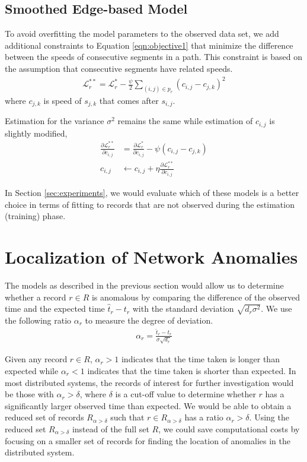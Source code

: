 \documentclass[conference]{IEEEtran.1.8}
\begin{document}
\subsection{Smoothed Edge-based Model}

To avoid overfitting the model parameters to the observed data set, we add additional constraints to Equation \ref{eqn:objective1} that minimize the difference between the speeds of consecutive segments in a path. This constraint is based on the assumption that consecutive segments have related speeds.
\begin{align*}
	\mathcal{L}^{**}_r = \mathcal{L}^*_r - \frac{\psi}{2} \sum_{(i,j) \in p_r} \left( c_{i,j} - c_{j,k} \right)^2
\end{align*}
where $c_{j,k}$ is speed of $s_{j,k}$ that comes after $s_{i,j}$.

Estimation for the variance $\sigma^2$ remains the same while estimation of $c_{i,j}$ is slightly modified,
\begin{align*}
	\frac{\partial \mathcal{L}^{**}_r}{\partial c_{i,j}} &= \frac{\partial \mathcal{L}^*_r}{\partial c_{i,j}} - \psi (c_{i,j} - c_{j,k}) \\
	c_{i,j} &\leftarrow c_{i,j} + \eta \frac{\partial \mathcal{L}^{**}_r}{\partial c_{i,j}}
\end{align*}

In Section \ref{sec:experiments}, we would evaluate which of these models is a better choice in terms of fitting to records that are not observed during the estimation (training) phase.

\section{Localization of Network Anomalies}
\label{sec:localization}

The models as described in the previous section would allow us to determine whether a record $r \in R$ is anomalous by comparing the difference of the observed time and the expected time $\hat{t}_r - t_r$ with the standard deviation $\sqrt{d_r \sigma^2}$. We use the following ratio $\alpha_r$ to measure the degree of deviation.
\begin{align}
	\label{eqn:alpha_ratio}
	\alpha_r = \frac{\hat{t}_r - t_r}{\sigma \sqrt{d_r}}
\end{align}

Given any record $r \in R$, $\alpha_r > 1$ indicates that the time taken is longer than expected while $\alpha_r < 1$ indicates that the time taken is shorter than expected. In most distributed systems, the records of interest for further investigation would be those with $\alpha_r > \delta$, where $\delta$ is a cut-off value to determine whether $r$ has a significantly larger observed time than expected. We would be able to obtain a reduced set of records $R_{\alpha > \delta}$ such that $r \in R_{\alpha > \delta}$ has a ratio $\alpha_r > \delta$. Using the reduced set $R_{\alpha > \delta}$ instead of the full set $R$, we could save computational costs by focusing on a smaller set of records for finding the location of anomalies in the distributed system.
\end{document}
